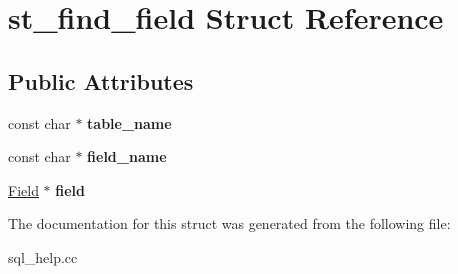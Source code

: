 \hypertarget{structst__find__field}{}\section{st\+\_\+find\+\_\+field Struct Reference}
\label{structst__find__field}
\subsection*{Public Attributes}
\begin{DoxyCompactItemize}
\item 
\mbox{\label{structst__find__field_ab471ccac652f5051d3e4dd9bbaa174a5}} 
const char $\ast$ {\bfseries table\+\_\+name}
\item 
\mbox{\label{structst__find__field_aaee19a3c5e15b593d63a3d80867425f9}} 
const char $\ast$ {\bfseries field\+\_\+name}
\item 
\mbox{\label{structst__find__field_a8a7fa74f0e09622a814494d57a2acbe1}} 
\mbox{\hyperlink{classField}{Field}} $\ast$ {\bfseries field}
\end{DoxyCompactItemize}


The documentation for this struct was generated from the following file\+:\begin{DoxyCompactItemize}
\item 
sql\+\_\+help.\+cc\end{DoxyCompactItemize}
